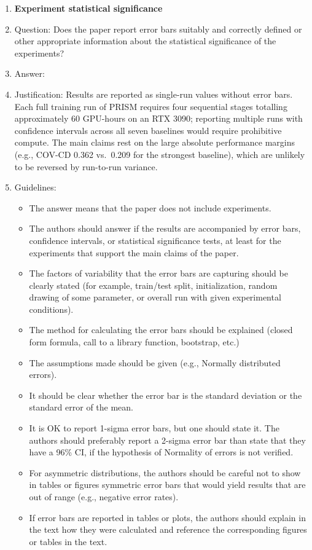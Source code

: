 \begin{enumerate}
\item {\bf Experiment statistical significance}
    \item[] Question: Does the paper report error bars suitably and correctly defined or other appropriate information about the statistical significance of the experiments?
    \item[] Answer: \answerNo{}
    \item[] Justification: Results are reported as single-run values without error bars. Each full training run of PRISM requires four sequential stages totalling approximately 60 GPU-hours on an RTX 3090; reporting multiple runs with confidence intervals across all seven baselines would require prohibitive compute. The main claims rest on the large absolute performance margins (e.g., COV-CD 0.362 vs.\ 0.209 for the strongest baseline), which are unlikely to be reversed by run-to-run variance.
    \item[] Guidelines:
    \begin{itemize}
        \item The answer \answerNA{} means that the paper does not include experiments.
        \item The authors should answer \answerYes{} if the results are accompanied by error bars, confidence intervals, or statistical significance tests, at least for the experiments that support the main claims of the paper.
        \item The factors of variability that the error bars are capturing should be clearly stated (for example, train/test split, initialization, random drawing of some parameter, or overall run with given experimental conditions).
        \item The method for calculating the error bars should be explained (closed form formula, call to a library function, bootstrap, etc.)
        \item The assumptions made should be given (e.g., Normally distributed errors).
        \item It should be clear whether the error bar is the standard deviation or the standard error of the mean.
        \item It is OK to report 1-sigma error bars, but one should state it. The authors should preferably report a 2-sigma error bar than state that they have a 96\% CI, if the hypothesis of Normality of errors is not verified.
        \item For asymmetric distributions, the authors should be careful not to show in tables or figures symmetric error bars that would yield results that are out of range (e.g., negative error rates).
        \item If error bars are reported in tables or plots, the authors should explain in the text how they were calculated and reference the corresponding figures or tables in the text.
    \end{itemize}


\end{enumerate}
